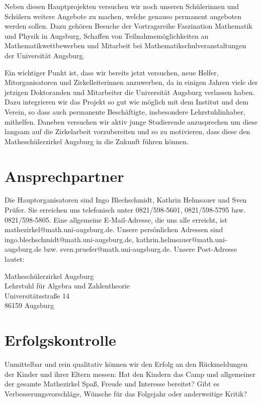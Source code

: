 \documentclass[12pt]{zettel}
\begin{document}
Neben diesen Hauptprojekten versuchen wir noch unseren Schülerinnen und
Schülern weitere Angebote zu machen, welche genauso permanent angeboten
werden sollen. Dazu gehören Besuche der Vortragsreihe Faszination
Mathematik und Physik in Augsburg, Schaffen von Teilnahmemöglichkeiten
an Mathematikwettbewerben und Mitarbeit bei
Mathematikschulveranstaltungen der Universität Augsburg.

Ein wichtiger Punkt ist, dass wir bereits jetzt versuchen, neue Helfer,
Mitorganisatoren und Zirkelleiterinnen anzuwerben, da in einigen Jahren
viele der jetzigen Doktoranden und Mitarbeiter die Universität Augsburg
verlassen haben. Dazu integrieren wir das Projekt so gut wie möglich mit
dem Institut und dem Verein, so dass auch permanente Beschäftigte,
insbesondere Lehrstuhlinhaber, mithelfen. Daneben versuchen wir aktiv
junge Studierende anzusprechen um diese langsam auf die Zirkelarbeit
vorzubereiten und so zu motivieren, dass diese den Matheschülerzirkel
Augsburg in die Zukunft führen können.


\section{Ansprechpartner}

Die Hauptorganisatoren sind Ingo Blechschmidt, Kathrin Helmsauer und Sven
Prüfer. Sie erreichen uns telefonisch unter 0821/598-5601, 0821/598-5795 bzw.
0821/598-5805. Eine allgemeine E-Mail-Adresse, die uns alle erreicht, ist
\textsf{mathezirkel@math.uni-augsburg.de}. Unsere persönlichen Adressen sind
\textsf{ingo.blechschmidt@math.uni-augsburg.de},
\textsf{kathrin.helmsauer@math.uni-augsburg.de} bzw.
\textsf{sven.pruefer@math.uni-augsburg.de}. Unsere Post-Adresse lautet:

\begin{tabbing}
  Matheschülerzirkel Augsburg \\
  Lehrstuhl für Algebra und Zahlentheorie \\
  Universitätsstraße 14 \\
  86159 Augsburg
\end{tabbing}


\section{Erfolgskontrolle}

Unmittelbar und rein qualitativ können wir den Erfolg an den Rückmeldungen der
Kinder und ihrer Eltern messen: Hat den Kindern das Camp und allgemeiner der
gesamte Mathezirkel Spaß, Freude und Interesse bereitet? Gibt es
Verbesserungsvorschläge, Wünsche für das Folgejahr oder anderweitige Kritik?
\end{document}
